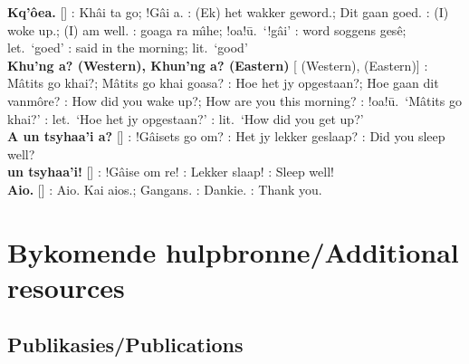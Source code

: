 \textbf{Kq'\^{o}ea.} []
: \textdoublebarpipe{}Kh\^{a}i ta go; !G\^{a}i a.
: (Ek) het wakker geword.; Dit gaan goed.
: (I) woke up.; (I) am well. :
\textdoublevertline{}goaga ra m\^{\i}he; !oa!\={u}.\ `!g\^{a}i'
: word soggens ges\^{e}; let.\ `goed' :
said in the morning; lit.\ `good' \\

\textbf{Khu\textdoublevertline{}'ng a? (Western),
Khun\textdoublevertline{}'ng a? (Eastern)}
[ (Western),  (Eastern)] : M\^{a}tits go \textdoublebarpipe{}khai?;
M\^{a}tits go \textdoublebarpipe{}khai \textdoublevertline{}goasa?
: Hoe het jy opgestaan?; Hoe gaan dit vanm\^{o}re?
: How did you wake up?; How are you this morning?
: !oa!\={u}.\ `M\^{a}tits go \textdoublebarpipe{}khai?'
: let.\ `Hoe het jy opgestaan?' : lit.\
`How did you get up?' \\

\textbf{\textvertline{}A un tsyhaa'i a? }
[] :
!G\^{a}isets go \textdoublevertline{}om? \underbar{Afr}: Het jy lekker
geslaap? \underbar{Eng}: Did you sleep well? \\

\textbf{un tsyhaa'i!} [] :
!G\^{a}ise \textdoublevertline{}om re! \underbar{Afr}: Lekker slaap!
\underbar{Eng}: Sleep well! \\

\textbf{Aio.} [] : Aio. Kai aios.;
Gangans. \underbar{Afr}: Dankie. \underbar{Eng}: Thank you. \\


\markboth{}{}
\section{Bykomende hulpbronne/Additional resources}
\markboth{}{}

\markboth{}{}
\subsection{Publikasies/Publications}
\markboth{}{}

